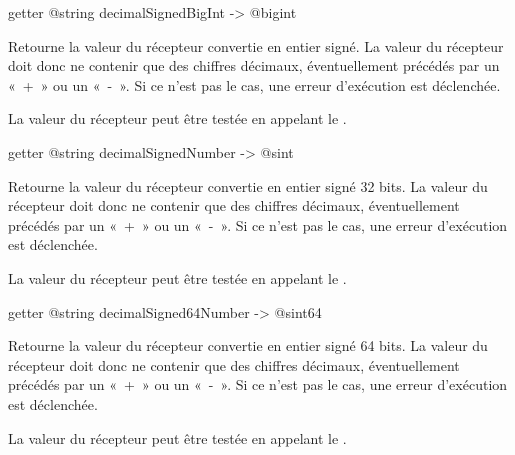 
\begin{galgasbox}
getter @string decimalSignedBigInt -> @bigint
\end{galgasbox}

Retourne la valeur du récepteur convertie en entier signé. La valeur du récepteur doit donc ne contenir que des chiffres décimaux, éventuellement précédés par un «~+~» ou un «~-~». Si ce n'est pas le cas, une erreur d'exécution est déclenchée.

La valeur du récepteur peut être testée en appelant le .








\begin{galgasbox}
getter @string decimalSignedNumber -> @sint
\end{galgasbox}

Retourne la valeur du récepteur convertie en entier signé 32 bits. La valeur du récepteur doit donc ne contenir que des chiffres décimaux, éventuellement précédés par un «~+~» ou un «~-~». Si ce n'est pas le cas, une erreur d'exécution est déclenchée.

La valeur du récepteur peut être testée en appelant le .








\begin{galgasbox}
getter @string decimalSigned64Number -> @sint64
\end{galgasbox}

Retourne la valeur du récepteur convertie en entier signé 64 bits. La valeur du récepteur doit donc ne contenir que des chiffres décimaux, éventuellement précédés par un «~+~» ou un «~-~». Si ce n'est pas le cas, une erreur d'exécution est déclenchée.

La valeur du récepteur peut être testée en appelant le .








